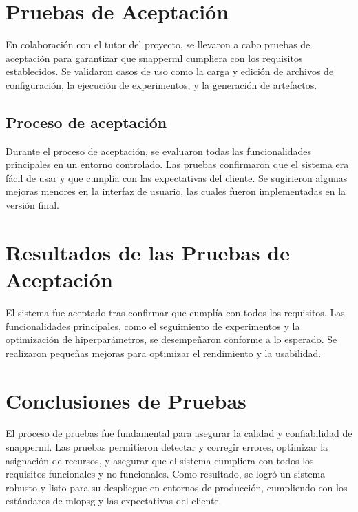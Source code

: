 \section{Pruebas de Aceptación}
En colaboración con el tutor del proyecto, se llevaron a cabo pruebas de aceptación para garantizar que \Gls{snapperml} cumpliera con los requisitos establecidos. Se validaron casos de uso como la carga y edición de archivos de configuración, la ejecución de experimentos, y la generación de artefactos.

\subsection{Proceso de aceptación}
Durante el proceso de aceptación, se evaluaron todas las funcionalidades principales en un entorno controlado. Las pruebas confirmaron que el sistema era fácil de usar y que cumplía con las expectativas del cliente. Se sugirieron algunas mejoras menores en la interfaz de usuario, las cuales fueron implementadas en la versión final.

\section{Resultados de las Pruebas de Aceptación}
El sistema fue aceptado tras confirmar que cumplía con todos los requisitos. Las funcionalidades principales, como el seguimiento de experimentos y la optimización de hiperparámetros, se desempeñaron conforme a lo esperado. Se realizaron pequeñas mejoras para optimizar el rendimiento y la usabilidad.

\section{Conclusiones de Pruebas}
El proceso de pruebas fue fundamental para asegurar la calidad y confiabilidad de \Gls{snapperml}. Las pruebas permitieron detectar y corregir errores, optimizar la asignación de recursos, y asegurar que el sistema cumpliera con todos los requisitos funcionales y no funcionales. Como resultado, se logró un sistema robusto y listo para su despliegue en entornos de producción, cumpliendo con los estándares de \Gls{mlopsg} y las expectativas del cliente.